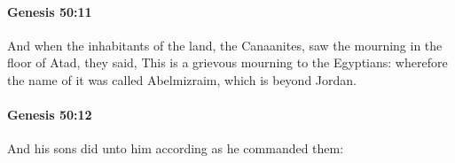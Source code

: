 		\paragraph{Genesis 50:11} %
			\label{GENESIS-50-11}

			And when the inhabitants of the land, the Canaanites, saw the mourning in the floor of Atad, they said, This is a grievous mourning to the Egyptians: wherefore the name of it was called Abelmizraim, which is beyond Jordan.


		\paragraph{Genesis 50:12} %
			\label{GENESIS-50-12}

			And his sons did unto him according as he commanded them:

